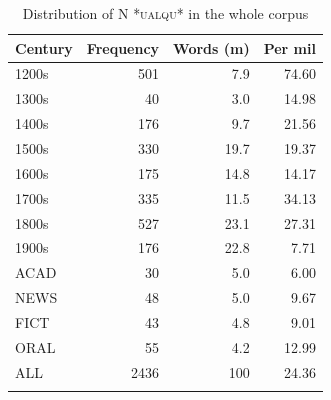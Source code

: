 \begin{table}
\caption{Distribution of N \textsc{*ualqu*} in the whole corpus}
\label{tab:extracted3}
\begin{tabular}{lrrr}
\lsptoprule
Century &  Frequency &  Words (m) &  Per mil\\
\midrule
{1200s} &  501 &  7.9 &  74.60   \\
{1300s} &  40 &  3.0 &  14.98   \\
{1400s} &  176 &  9.7 &  21.56   \\
{1500s} &  330 &  19.7 &  19.37   \\
{1600s} &  175 &  14.8 &  14.17   \\
{1700s} &  335 &  11.5 &  34.13   \\
{1800s} &  527 &  23.1 &  27.31   \\
{1900s} &  176 &  22.8 &  7.71   \\
\tablevspace
{ACAD} &  30 &  5.0 &  6.00   \\
{NEWS} &  48 &  5.0 &  9.67   \\
{FICT} &  43 &  4.8 &  9.01   \\
{ORAL}  &  55 &  4.2   &  12.99 \\
\midrule
{ALL} &  2436 &  100 &  24.36    \\
\lspbottomrule
\end{tabular}
\end{table}

